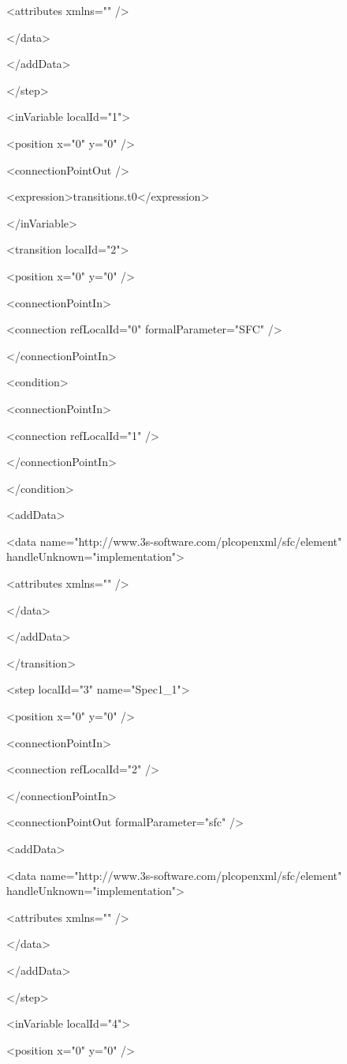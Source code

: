 {    <attributes xmlns="" />

   </data>

  </addData>

 </step>

 <inVariable localId="1">

  <position x="0" y="0" />

  <connectionPointOut />

  <expression>transitions.t0</expression>

 </inVariable>

 <transition localId="2">

  <position x="0" y="0" />

  <connectionPointIn>

   <connection refLocalId="0" formalParameter="SFC" />

  </connectionPointIn>

  <condition>

   <connectionPointIn>

    <connection refLocalId="1" />

   </connectionPointIn>

  </condition>

  <addData>

   <data name="http://www.3s-software.com/plcopenxml/sfc/element" handleUnknown="implementation">

    <attributes xmlns="" />

   </data>

  </addData>

 </transition>

 <step localId="3" name="Spec1\_1">

  <position x="0" y="0" />

  <connectionPointIn>

   <connection refLocalId="2" />

  </connectionPointIn>

  <connectionPointOut formalParameter="sfc" />

  <addData>

   <data name="http://www.3s-software.com/plcopenxml/sfc/element" handleUnknown="implementation">

    <attributes xmlns="" />

   </data>

  </addData>

 </step>

 <inVariable localId="4">

  <position x="0" y="0" />

}
